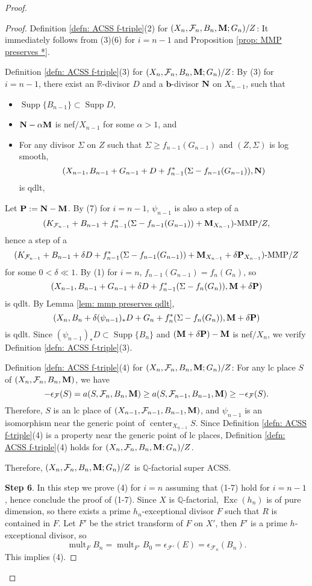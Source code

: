 \documentclass[11pt]{amsart}
\numberwithin{equation}{section}
\newcommand{\bb}{\bm{b}}
\newcommand{\Mm}{{\bf{M}}}
\newcommand{\Nn}{{\bf{N}}}
\newcommand{\Pp}{{\bf{P}}}
\newcommand{\Qq}{\mathbb{Q}}
\newcommand{\Rr}{\mathbb{R}}
\newcommand{\Center}{\operatorname{center}}
\newcommand{\Exc}{\operatorname{Exc}}
\newcommand{\Supp}{\operatorname{Supp}}
\newcommand{\mult}{\operatorname{mult}}
\newcommand{\Ff}{\mathcal{F}}
\theoremstyle{definition}
\theoremstyle{definition}
\theoremstyle{definition}
\begin{document}
\begin{proof}
\begin{proof}
Definition \ref{defn: ACSS f-triple}(2) for $(X_n,\Ff_n,B_n,\Mm;G_n)/Z$: It immediately follows from (3)(6) for $i=n-1$ and  Proposition \ref{prop: MMP preserves *}.

Definition \ref{defn: ACSS f-triple}(3) for $(X_n,\Ff_n,B_n,\Mm;G_n)/Z$: By (3) for $i=n-1$, there exist an $\Rr$-divisor $D$ and a $\bb$-divisor $\Nn$ on $X_{n-1}$, such that
\begin{itemize}
    \item $\Supp\{B_{n-1}\}\subset\Supp D$,
    \item $\Nn-\alpha\Mm$ is nef$/X_{n-1}$ for some $\alpha>1$, and
    \item For any divisor $\Sigma$ on $Z$ such that $\Sigma\geq f_{n-1}(G_{n-1})$ and $(Z,\Sigma)$ is log smooth,
$$(X_{n-1},B_{n-1}+G_{n-1}+D+f_{n-1}^*(\Sigma-f_{n-1}(G_{n-1})),\Nn)$$ is qdlt, 
\end{itemize}
Let $\Pp:=\Nn-\Mm$. By (7) for $i=n-1$, $\psi_{n-1}$ is also a step of a $$(K_{\Ff_{n-1}}+B_{n-1}+f_{n-1}^*(\Sigma-f_{n-1}(G_{n-1}))+\Mm_{X_{n-1}})\text{-MMP}/Z,$$ hence a step of a 
$$(K_{\Ff_{n-1}}+B_{n-1}+\delta D+f_{n-1}^*(\Sigma-f_{n-1}(G_{n-1}))+\Mm_{X_{n-1}}+\delta\Pp_{X_{n-1}})\text{-MMP}/Z$$ 
for some $0<\delta\ll 1$. By (1) for $i=n$, $f_{n-1}(G_{n-1})=f_n(G_n)$, so 
$$(X_{n-1},B_{n-1}+G_{n-1}+\delta D+f_{n-1}^*(\Sigma-f_n(G_n)),\Mm+\delta\Pp)$$ is qdlt. By Lemma \ref{lem: mmp preserves qdlt}, $$(X_{n},B_{n}+\delta(\psi_{n-1})_*D+G_n+f_{n}^*(\Sigma-f_{n}(G_{n})),\Mm+\delta\Pp)$$ is qdlt. Since $(\psi_{n-1})_*D\subset\Supp\{B_n\}$ and $(\Mm+\delta\Pp)-\Mm$ is nef$/X_n$, we verify Definition \ref{defn: ACSS f-triple}(3).

Definition \ref{defn: ACSS f-triple}(4) for $(X_n,\Ff_n,B_n,\Mm;G_n)/Z$: For any lc place $S$ of $(X_n,\Ff_n,B_n,\Mm)$, we have
      $$-\epsilon_{\Ff}(S)=a(S,\Ff_n,B_n,\Mm)\geq a(S,\Ff_{n-1},B_{n-1},\Mm)\geq -\epsilon_{\Ff}(S).$$
      Therefore, $S$ is an lc place of $(X_{n-1},\Ff_{n-1},B_{n-1},\Mm)$, and $\psi_{n-1}$ is an isomorphism near the generic point of $\Center_{X_{n-1}}S$. Since Definition \ref{defn: ACSS f-triple}(4) is a property near the generic point of lc places,       
Definition \ref{defn: ACSS f-triple}(4) holds for $(X_n,\Ff_n,B_n,\Mm;G_n)/Z$.

Therefore, $(X_n,\Ff_n,B_n,\Mm;G_n)/Z$ is $\Qq$-factorial super ACSS.

\medskip

\noindent\textbf{Step 6}. In this step we prove (4) for $i=n$ assuming that (1-7) hold for $i=n-1$, hence conclude the proof of (1-7). Since $X$ is $\Qq$-factorial, $\Exc(h_n)$ is of pure dimension, so there exists a prime $h_n$-exceptional divisor $F$ such that $R$ is contained in $F$. Let $F'$ be the strict transform of $F$ on $X'$, then $F'$ is a prime $h$-exceptional divisor, so 
$$\mult_FB_n=\mult_{F'}B_0=\epsilon_{\Ff'}(E)=\epsilon_{\Ff_n}(B_n).$$
This implies (4). 


\end{proof}
\end{proof}
\end{document}
